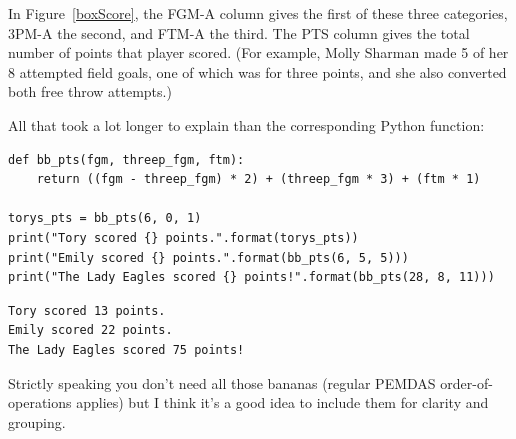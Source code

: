 In Figure~\ref{boxScore}, the \textsf{FGM-A} column gives the first of these
three categories, \textsf{3PM-A} the second, and \textsf{FTM-A} the third. The
\textsf{PTS} column gives the total number of points that player scored. (For
example, Molly Sharman made 5 of her 8 attempted field goals, one of which was
for three points, and she also converted both free throw attempts.)

All that took a lot longer to explain than the corresponding Python function:

\begin{Verbatim}[fontsize=\small,samepage=true,frame=single,framesep=3mm]
def bb_pts(fgm, threep_fgm, ftm):
    return ((fgm - threep_fgm) * 2) + (threep_fgm * 3) + (ftm * 1)

torys_pts = bb_pts(6, 0, 1)
print("Tory scored {} points.".format(torys_pts))
print("Emily scored {} points.".format(bb_pts(6, 5, 5)))
print("The Lady Eagles scored {} points!".format(bb_pts(28, 8, 11)))
\end{Verbatim}
\vspace{-.2in}

\begin{Verbatim}[fontsize=\small,samepage=true,frame=leftline,framesep=5mm,framerule=1mm]
Tory scored 13 points.
Emily scored 22 points.
The Lady Eagles scored 75 points!
\end{Verbatim}


Strictly speaking you don't need all those bananas (regular PEMDAS
order-of-operations applies) but I think it's a good idea to include them for
clarity and grouping.

